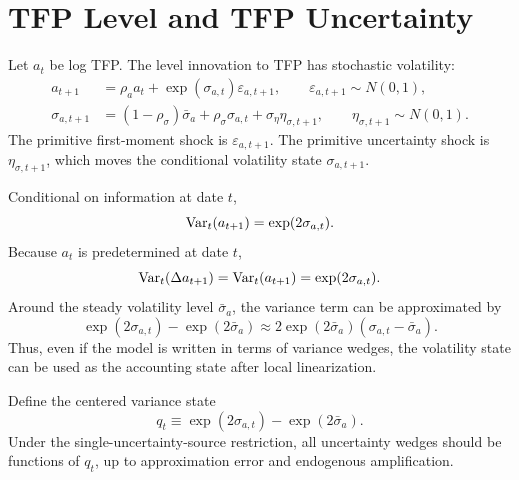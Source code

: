 \section{TFP Level and TFP Uncertainty}

Let \(a_t\) be log TFP. The level innovation to TFP has stochastic volatility:
\begin{align}
    a_{t+1}
    &=
    \rho_a a_t
    +
    \exp(\sigma_{a,t})\varepsilon_{a,t+1},
    \qquad
    \varepsilon_{a,t+1}\sim N(0,1),
    \label{eq:tfp_level}
    \\
    \sigma_{a,t+1}
    &=
    (1-\rho_\sigma)\bar{\sigma}_a
    +
    \rho_\sigma \sigma_{a,t}
    +
    \sigma_\eta \eta_{\sigma,t+1},
    \qquad
    \eta_{\sigma,t+1}\sim N(0,1).
    \label{eq:tfp_vol}
\end{align}
The primitive first-moment shock is \(\varepsilon_{a,t+1}\). The primitive
uncertainty shock is \(\eta_{\sigma,t+1}\), which moves the conditional
volatility state \(\sigma_{a,t+1}\).

Conditional on information at date \(t\),
\begin{equation}
    \operatorname{Var}_t(a_{t+1})
    =
    \exp(2\sigma_{a,t}).
    \label{eq:conditional_tfp_variance}
\end{equation}
Because \(a_t\) is predetermined at date \(t\),
\begin{equation}
    \operatorname{Var}_t(\Delta a_{t+1})
    =
    \operatorname{Var}_t(a_{t+1})
    =
    \exp(2\sigma_{a,t}).
    \label{eq:conditional_tfp_growth_variance}
\end{equation}
Around the steady volatility level \(\bar{\sigma}_a\), the variance term can be
approximated by
\begin{equation}
    \exp(2\sigma_{a,t})-\exp(2\bar{\sigma}_a)
    \approx
    2\exp(2\bar{\sigma}_a)(\sigma_{a,t}-\bar{\sigma}_a).
    \label{eq:variance_linearization}
\end{equation}
Thus, even if the model is written in terms of variance wedges, the volatility
state can be used as the accounting state after local linearization.

Define the centered variance state
\begin{equation}
    q_t
    \equiv
    \exp(2\sigma_{a,t})-\exp(2\bar{\sigma}_a).
    \label{eq:variance_state}
\end{equation}
Under the single-uncertainty-source restriction, all uncertainty wedges should
be functions of \(q_t\), up to approximation error and endogenous amplification.
